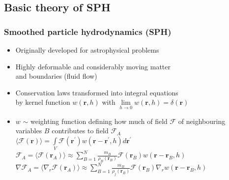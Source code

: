 \documentclass{beamer}
\begin{document}
\subsection{Basic theory of SPH}
\begin{frame}
\frametitle{Smoothed particle hydrodynamics (SPH)}
\begin{itemize}
\item Originally developed for astrophysical problems
\item Highly deformable and considerably moving matter \\ and boundaries (fluid flow)
\item Conservation laws transformed into integral equations \\ by kernel function $w\left({\bm r}, h\right)$ with $\lim\limits_{h\rightarrow 0}w\left({\bm r}, h\right)=\delta\left({\bm r}\right)$
\item $w$ $\sim$ weighting function defining how much of field $\mathcal{F}$ of neighbouring variables $B$ contributes to field $\mathcal{F}_A$ \\
\vskip3mm
$\langle\mathcal{F}\left({\bm r}\right)\rangle=\int\limits_V\mathcal{F}\left({\bm r}^\prime\right)w\left({\bm r} - {\bm r}^\prime, h\right)d{\bm r}^\prime$ \\
$\mathcal{F}_A=\langle\mathcal{F}\left({\bm r_A}\right)\rangle\approx\sum\limits_{B=1}^{N}\frac{m_B}{\rho_B\left({\bm r}_B\right)}\mathcal{F}\left({\bm r}_B\right)w\left({\bm r}-{\bm r}_B, h\right)$ \\
$\nabla\mathcal{F}_A=\langle\nabla_r\mathcal{F}\left({\bm r_A}\right)\rangle\approx\sum\limits_{B=1}^{N}\frac{m_B}{\rho_j\left({\bm r}_B\right)}\mathcal{F}\left({\bm r}_B\right)\nabla_r w\left({\bm r} - {\bm r}_B, h\right)$
\end{itemize}
\end{frame}
\end{document}
